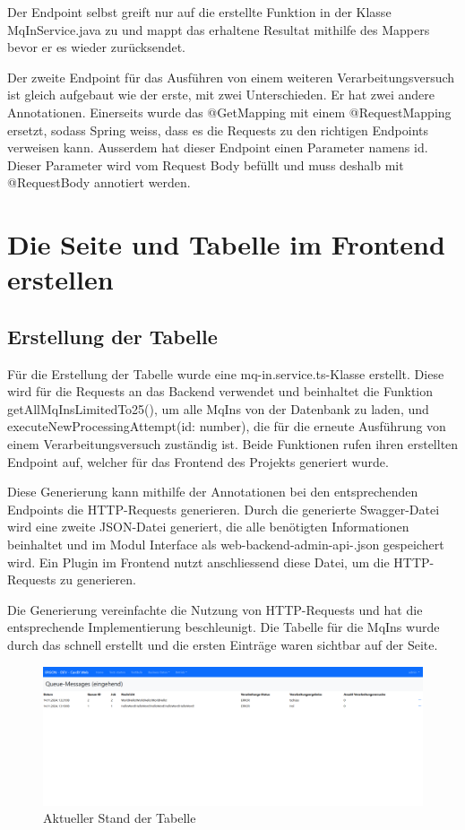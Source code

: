 \noindent Der Endpoint selbst greift nur auf die erstellte Funktion in der Klasse MqInService.java zu und mappt das erhaltene Resultat mithilfe des Mappers bevor er es wieder zurücksendet.

Der zweite Endpoint für das Ausführen von einem weiteren Verarbeitungsversuch ist gleich aufgebaut wie der erste, mit zwei Unterschieden. Er hat zwei andere Annotationen. Einerseits wurde das @GetMapping mit einem @RequestMapping ersetzt, sodass Spring weiss, dass es die Requests zu den richtigen Endpoints verweisen kann. Ausserdem hat dieser Endpoint einen Parameter namens id. Dieser Parameter wird vom Request Body befüllt und muss deshalb mit @RequestBody annotiert werden.

\section{Die Seite und Tabelle im Frontend erstellen}

\subsection{Erstellung der Tabelle}\label{ch:creation-of-table}
Für die Erstellung der Tabelle wurde eine mq-in.service.ts-Klasse erstellt. Diese wird für die Requests an das Backend verwendet und beinhaltet die Funktion getAllMqInsLimitedTo25(), um alle MqIns von der Datenbank zu laden, und executeNewProcessingAttempt(id: number), die für die erneute Ausführung von einem Verarbeitungsversuch zuständig ist. Beide Funktionen rufen ihren erstellten Endpoint auf, welcher für das Frontend des Projekts generiert wurde.

Diese Generierung kann mithilfe der Annotationen bei den entsprechenden Endpoints die HTTP-Requests generieren. Durch die generierte Swagger-Datei wird eine zweite JSON-Datei generiert, die alle benötigten Informationen beinhaltet und im Modul Interface als web-backend-admin-api-.json gespeichert wird. Ein Plugin im Frontend nutzt anschliessend diese Datei, um die HTTP-Requests zu generieren.

Die Generierung vereinfachte die Nutzung von HTTP-Requests und hat die entsprechende Implementierung beschleunigt. Die Tabelle für die MqIns wurde durch das schnell erstellt und die ersten Einträge waren sichtbar auf der Seite.

\begin{figure}[H]
	\begin{center}
		\includegraphics[width=1\textwidth]{ressourcen/4.2_Tabelle}
		\caption[Aktueller Stand der Tabelle]{Aktueller Stand der Tabelle}\label{fig:4.2-tabelle}
	\end{center}
\end{figure}

